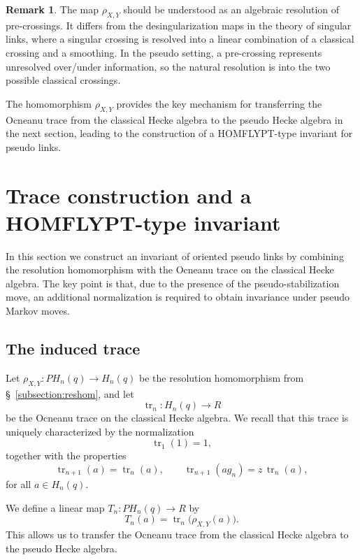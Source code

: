 \documentclass[11pt]{article}
\numberwithin{equation}{section}
\theoremstyle{definition}
\newtheorem{remark}[theorem]{Remark}
\begin{document}
\begin{remark}
The map \(\rho_{X,Y}\) should be understood as an algebraic resolution of pre-crossings. It differs from the desingularization maps in the theory of singular links, where a singular crossing is resolved into a linear combination of a classical crossing and a smoothing. In the pseudo setting, a pre-crossing represents unresolved over/under information, so the natural resolution is into the two possible classical crossings.
\end{remark}

The homomorphism \(\rho_{X,Y}\) provides the key mechanism for transferring the Ocneanu trace from the classical Hecke algebra to the pseudo Hecke algebra in the next section, leading to the construction of a HOMFLYPT-type invariant for pseudo links.



\section{Trace construction and a HOMFLYPT-type invariant}\label{trace}

In this section we construct an invariant of oriented pseudo links by combining the resolution homomorphism with the Ocneanu trace on the classical Hecke algebra. The key point is that, due to the presence of the pseudo-stabilization move, an additional normalization is required to obtain invariance under pseudo Markov moves.


\subsection{The induced trace}

Let \(\rho_{X,Y}:PH_n(q)\to H_n(q)\) be the resolution homomorphism from \S~\ref{subsection:reshom}, and let
\[
\operatorname{tr}_n:H_n(q)\to R
\]
be the Ocneanu trace on the classical Hecke algebra. We recall that this trace is uniquely characterized by the normalization
\[
\operatorname{tr}_1(1)=1,
\]
together with the properties
\[
\operatorname{tr}_{n+1}(a)=\operatorname{tr}_n(a),
\qquad
\operatorname{tr}_{n+1}(a g_n)=z\,\operatorname{tr}_n(a),
\]
for all \(a\in H_n(q)\).

\medskip 

We define a linear map \(T_n:PH_n(q)\to R\) by
\[
T_n(a)=\operatorname{tr}_n\big(\rho_{X,Y}(a)\big).
\]
This allows us to transfer the Ocneanu trace from the classical Hecke algebra to the pseudo Hecke algebra.
\end{document}
